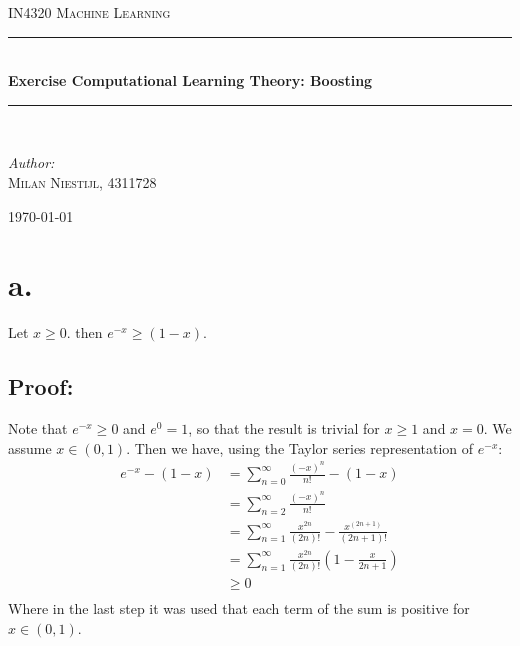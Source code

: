 \documentclass [a4paper] {report}
\begin{document}
	
	\begin{titlepage}
		\begin{center}
			
			\textsc{\LARGE IN4320 Machine Learning}\\[1.25cm]
			
			\rule{\linewidth}{0.5mm}\\[1.0cm]
			{\huge \bfseries Exercise Computational Learning Theory: Boosting }\\[0.6cm]
			\rule{\linewidth}{0.5mm}\\[1.5cm]
			
			\begin{minipage}{0.4\textwidth}
				\begin{flushleft} \large	
					\emph{Author:}\\
					\textsc{Milan Niestijl, 4311728}
				\end{flushleft}
			\end{minipage}
			
			\vfill
			{\large \today}
		\end{center}
	\end{titlepage}
	
	\section*{a.}
	Let $x\geq0$. then $e^{-x} \geq (1-x)$.\\
	\subsection*{Proof:}
	Note that $e^{-x} \geq 0$ and $e^{0} = 1$, so that the result is trivial for $x\geq 1$ and $x=0$. We assume $x \in (0,1)$. Then we have, using the Taylor series representation of $e^{-x}$:
	\begin{equation*}
		\begin{split}
			e^{-x} - (1-x) &=\sum_{n=0}^{\infty}\frac{(-x)^{n}}{n!} - (1-x)\\
			&= \sum_{n=2}^{\infty}\frac{(-x)^{n}}{n!}\\
			&= \sum_{n=1}^{\infty}\frac{x^{2n}}{(2n)!} - \frac{x^{(2n+1)}}{(2n+1)!}\\
			&= \sum_{n=1}^{\infty}\frac{x^{2n}}{(2n)!}\left( 1 - \frac{x}{2n + 1} \right)\\
			&\geq 0\\
		\end{split}
	\end{equation*}
	Where in the last step it was used that each term of the sum is positive for $x \in (0,1)$.
\end{document}
